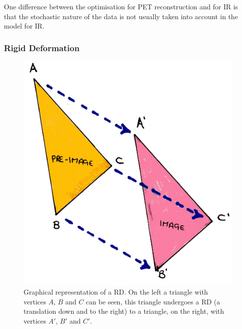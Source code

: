             One difference between the optimisation for \gls{PET} reconstruction and for \gls{IR} is that the stochastic nature of the data is not usually taken into account in the model for \gls{IR}.
            
            \subsubsection{Rigid Deformation} \label{sec:rigid_deformation}
                \begin{figure}
                    \centering
                    
                    \includegraphics[width=1.0\linewidth]{figures/background_rd.png}
                    
                    \captionsetup{singlelinecheck=false, justification=raggedright}
                    \caption{Graphical representation of a \gls{RD}. On the left a triangle with vertices $A$, $B$ and $C$ can be seen, this triangle undergoes a \gls{RD} (a translation down and to the right) to a triangle, on the right, with vertices $A'$, $B'$ and $C'$.} \label{fig:rigid_transformations_rd}
                \end{figure}
                

